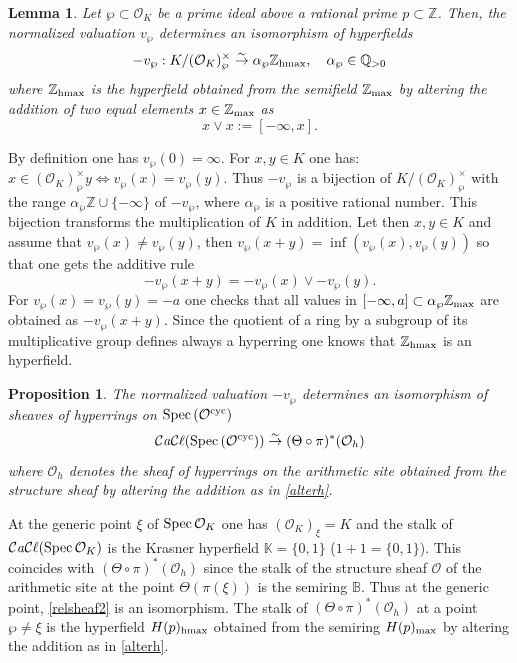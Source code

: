 \documentclass[noams,lp]{compositio}
\newtheorem{prop}[thm]{Proposition}
\newtheorem{lem}[thm]{Lemma}
\def\Spec{{\rm Spec\,}}
\def\B{{\mathbb B}}
\def\K{{\mathbb K}}
\def\Q{{\mathbb Q}}
\def\Z{{\mathbb Z}}
\def\cO{{\mathcal O}}
\def\ocy{{\cO^{\rm cyc}}}
\def\card{{\mathcal{C}\it{a}\mathcal{C}\ell}}
\def\zmax{{\Z_{\rm max}}}
\def\zhmax{{\Z_{\rm hmax}}}
\begin{document}
\begin{lem}\label{hyper}
Let $\wp\subset\cO_K$ be a prime ideal above a rational prime $p\subset\Z$. Then, the normalized valuation $v_\wp$ determines an isomorphism of hyperfields 
\begin{equation}\label{minusvj}
-v_\wp:K/(\cO_K)_\wp^\times\stackrel{\sim}{\to} \alpha_\wp\zhmax,\quad \alpha_\wp\in\Q_{>0}
\end{equation}
where $\zhmax$ is the hyperfield obtained from the semifield $\zmax$ by altering the addition of two equal elements $x\in\zmax$ as
\begin{equation}\label{alterh}
x\vee x:=[-\infty,x].
\end{equation}
\end{lem}
\proof By definition one has $v_\wp(0)=\infty$. For $x,y\in K$ one has: $x\in (\cO_K)_\wp^\times y \iff v_\wp(x)=v_\wp(y)$. Thus $-v_\wp$ is a bijection of   $K/(\cO_K)_\wp^\times$ with  the range $\alpha_\wp\Z\cup \{-\infty\}$ of $-v_\wp$, where $\alpha_\wp$ is a positive rational number. This bijection transforms the multiplication of $K$ in addition. Let then $x,y\in K$ and assume that $v_\wp(x)\neq v_\wp(y)$, then $v_\wp(x+y)=\inf (v_\wp(x),v_\wp(y))$ so that one gets the additive rule 
$$
-v_\wp(x+y)=-v_\wp(x)\vee -v_\wp(y).
$$
For $v_\wp(x)= v_\wp(y)=-a$ one checks that all values in $[-\infty,a]\subset \alpha_\wp \zmax$ are obtained as $-v_\wp(x+y)$. Since  the quotient of a ring by a subgroup of its multiplicative group defines always a hyperring one knows that $\zhmax$ is an hyperfield. \endproof

\begin{prop}\label{sheavesonspz} The normalized valuation $-v_\wp$ determines an isomorphism of sheaves of hyperrings on $\Spec(\ocy)$
\begin{equation}\label{relsheaf2}
\card(\Spec(\ocy))\stackrel{\sim}{\to} (\Theta\circ \pi)^*(\cO_h)
\end{equation}
where $\cO_h$ denotes the sheaf of hyperrings on the arithmetic site obtained from the structure sheaf by altering the addition as in \eqref{alterh}.
\end{prop}
\proof  At the generic point $\xi$ of $\Spec\cO_K$ one has $(\cO_K)_\xi=K$ and the stalk of $\card(\Spec\cO_K)$ is the Krasner hyperfield $\K=\{0,1\}$ ($1+1=\{0,1\}$). This coincides with  $(\Theta\circ \pi)^*(\cO_h)$ since the stalk of the structure sheaf $\cO$ of the arithmetic site at the point $\Theta(\pi(\xi))$ is the semiring $\B$. Thus at the generic point,  \eqref{relsheaf2} is an isomorphism. The stalk of $(\Theta\circ \pi)^*(\cO_h)$ at a point $\wp\neq \xi$ is the hyperfield  $H(p)_{\rm hmax}$ obtained from the semiring $H(p)_{\rm max}$ by altering the addition as in \eqref{alterh}.
\end{document}
